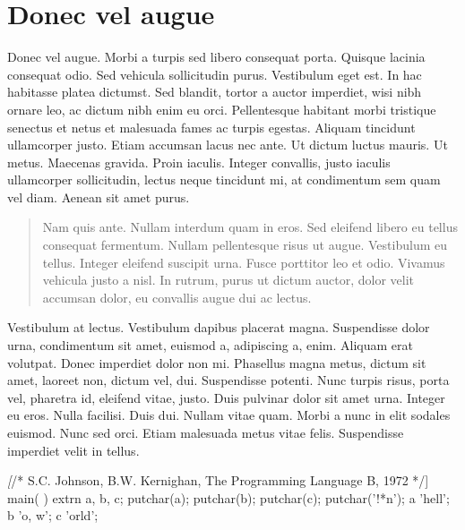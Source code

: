 \documentclass[cfonts]{nostarch}
\begin{document}
\section{Donec vel augue}


Donec vel augue. Morbi a turpis sed libero consequat
porta. Quisque lacinia consequat odio. Sed vehicula sollicitudin
purus. Vestibulum eget est. In hac habitasse platea dictumst. Sed
blandit, tortor a auctor imperdiet, wisi nibh ornare leo, ac dictum
nibh enim eu orci.  Pellentesque habitant morbi tristique senectus et
netus et malesuada fames ac turpis egestas.  Aliquam tincidunt
ullamcorper justo. Etiam accumsan lacus nec ante.  Ut dictum luctus
mauris. Ut metus. Maecenas gravida. Proin iaculis.  Integer convallis,
justo iaculis ullamcorper sollicitudin, lectus neque tincidunt mi, at
condimentum sem quam vel diam. Aenean sit amet purus.
\begin{quote}
  Nam quis ante. Nullam interdum quam in eros.  Sed eleifend libero eu
  tellus consequat fermentum. Nullam pellentesque risus ut augue.
  Vestibulum eu tellus. Integer eleifend suscipit urna. Fusce
  porttitor leo et odio. Vivamus vehicula justo a nisl. In rutrum,
  purus ut dictum auctor, dolor velit accumsan dolor, eu convallis
  augue dui ac lectus. 
\end{quote}

Vestibulum at lectus. Vestibulum dapibus placerat magna. Suspendisse
dolor urna, condimentum sit amet, euismod a, adipiscing a, enim.
Aliquam erat volutpat. Donec imperdiet dolor non mi. Phasellus magna
metus, dictum sit amet, laoreet non, dictum vel, dui. Suspendisse
potenti. Nunc turpis risus, porta vel, pharetra id,
eleifend vitae, justo. Duis pulvinar dolor sit amet urna.
Integer eu eros. Nulla facilisi. Duis dui.  Nullam vitae
quam. Morbi a nunc in elit sodales euismod.
Nunc sed orci. Etiam malesuada metus vitae
felis. Suspendisse imperdiet velit in tellus.
\begin{quotation}
\lipsum[40-41]  
\end{quotation}
\lipsum[63-65]
\begin{Code}[commandchars=\\\[\]]
\textit[/* S.C. Johnson, B.W. Kernighan, The Programming Language B, 1972 */]
main( ) {
   extrn a, b, c;
   putchar(a); putchar(b); putchar(c); putchar('!*n');
 }
 a 'hell';
 b 'o, w';
 c 'orld';  
\end{Code}
\end{document}
